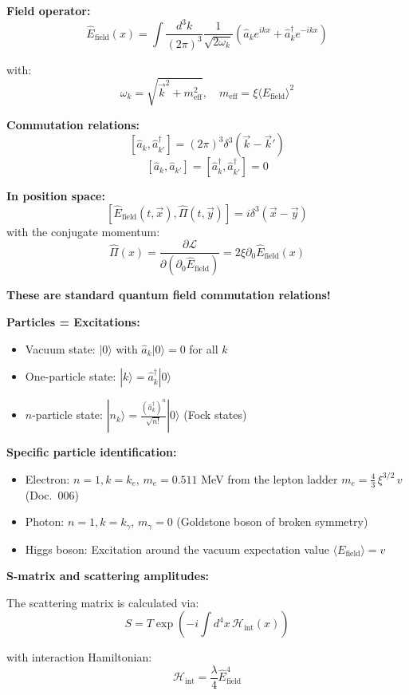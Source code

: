 	\textbf{Field operator:}
	\[
	\hat{E}_{\text{field}}(x) = \int \frac{d^3k}{(2\pi)^3} \frac{1}{\sqrt{2\omega_k}} \left(\hat{a}_k e^{ikx} + \hat{a}^\dagger_k e^{-ikx}\right)
	\]
	
	with:
	\[
	\omega_k = \sqrt{\vec{k}^2 + m_{\text{eff}}^2}, \quad m_{\text{eff}} = \xi \langle E_{\text{field}} \rangle^2
	\]
	
	\textbf{Commutation relations:}
	\[
	[\hat{a}_k, \hat{a}^\dagger_{k'}] = (2\pi)^3 \delta^3(\vec{k} - \vec{k}')
	\]
	\[
	[\hat{a}_k, \hat{a}_{k'}] = [\hat{a}^\dagger_k, \hat{a}^\dagger_{k'}] = 0
	\]
	
	\textbf{In position space:}
	\[
	[\hat{E}_{\text{field}}(t, \vec{x}), \hat{\Pi}(t, \vec{y})] = i \delta^3(\vec{x} - \vec{y})
	\]
	with the conjugate momentum:
	\[
	\hat{\Pi}(x) = \frac{\partial \mathcal{L}}{\partial (\partial_0 \hat{E}_{\text{field}})} = 2\xi \partial_0 \hat{E}_{\text{field}}(x)
	\]
	
	\textbf{These are standard quantum field commutation relations!}
	
	\textbf{Particles = Excitations:}
	\begin{itemize}
		\item Vacuum state: $|0\rangle$ with $\hat{a}_k |0\rangle = 0$ for all $k$
		\item One-particle state: $|k\rangle = \hat{a}^\dagger_k |0\rangle$
		\item $n$-particle state: $|n_k\rangle = \frac{(\hat{a}^\dagger_k)^n}{\sqrt{n!}} |0\rangle$ (Fock states)
	\end{itemize}
	
	\textbf{Specific particle identification:}
	\begin{itemize}
		\item Electron: $n=1, k=k_e$, $m_e = 0.511$ MeV from the lepton ladder $m_e = \frac{4}{3}\,\xi^{3/2}\,v$ (Doc.~006)
		\item Photon: $n=1, k=k_\gamma$, $m_\gamma = 0$ (Goldstone boson of broken symmetry)
		\item Higgs boson: Excitation around the vacuum expectation value $\langle E_{\text{field}} \rangle = v$
	\end{itemize}
	
	\textbf{S-matrix and scattering amplitudes:}
	
	The scattering matrix is calculated via:
	\[
	S = T \exp\left(-i \int d^4x \, \mathcal{H}_{\text{int}}(x)\right)
	\]
	
	with interaction Hamiltonian:
	\[
	\mathcal{H}_{\text{int}} = \frac{\lambda}{4} \hat{E}_{\text{field}}^4
	\]
	
